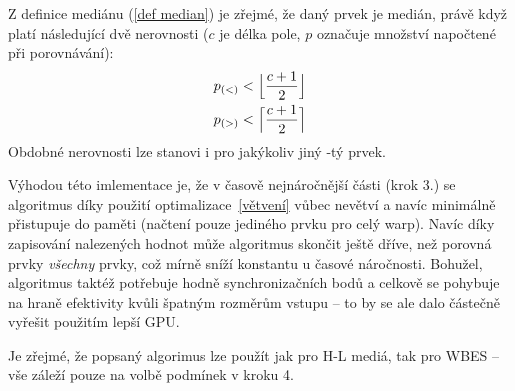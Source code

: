     Z definice mediánu (\ref{def median}) je zřejmé, že daný prvek je medián, právě když platí následující dvě nerovnosti ($c$ je délka pole, $p$ označuje množství napočtené při porovnávání):
    \begin{align}
      p_{(<)} < \Big\lfloor\frac{c+1}{2}\Big\rfloor \notag \\
      p_{(>)} < \Big\lceil\frac{c+1}{2}\Big\rceil \notag
    \end{align}
    Obdobné nerovnosti lze stanovi i pro jakýkoliv jiný \kk-tý prvek.

    Výhodou této imlementace je, že v časově nejnáročnější části (krok 3.) se algoritmus díky použití optimalizace~\ref{větvení} vůbec nevětví a navíc minimálně přistupuje do paměti (načtení pouze jediného prvku pro celý warp). Navíc díky zapisování nalezených hodnot může algoritmus skončit ještě dříve, než porovná prvky \emph{všechny} prvky, což mírně sníží konstantu u časové náročnosti. Bohužel, algoritmus taktéž potřebuje hodně synchronizačních bodů a celkově se pohybuje na hraně efektivity kvůli špatným rozměrům vstupu -- to by se ale dalo částečně vyřešit použitím lepší GPU.

    Je zřejmé, že popsaný algorimus lze použít jak pro H-L mediá, tak pro WBES -- vše záleží pouze na volbě podmínek v kroku 4.

